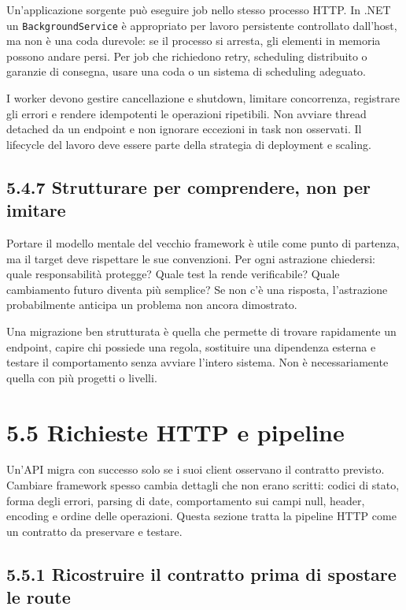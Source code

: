 \documentclass[
  italian,
  10pt,
]{book}
\begin{document}
Un'applicazione sorgente può eseguire job nello stesso processo HTTP. In
.NET un \texttt{BackgroundService} è appropriato per lavoro persistente
controllato dall'host, ma non è una coda durevole: se il processo si
arresta, gli elementi in memoria possono andare persi. Per job che
richiedono retry, scheduling distribuito o garanzie di consegna, usare
una coda o un sistema di scheduling adeguato.

I worker devono gestire cancellazione e shutdown, limitare concorrenza,
registrare gli errori e rendere idempotenti le operazioni ripetibili.
Non avviare thread detached da un endpoint e non ignorare eccezioni in
task non osservati. Il lifecycle del lavoro deve essere parte della
strategia di deployment e scaling.

\subsection{5.4.7 Strutturare per comprendere, non per
imitare}\label{strutturare-per-comprendere-non-per-imitare}

Portare il modello mentale del vecchio framework è utile come punto di
partenza, ma il target deve rispettare le sue convenzioni. Per ogni
astrazione chiedersi: quale responsabilità protegge? Quale test la rende
verificabile? Quale cambiamento futuro diventa più semplice? Se non c'è
una risposta, l'astrazione probabilmente anticipa un problema non ancora
dimostrato.

Una migrazione ben strutturata è quella che permette di trovare
rapidamente un endpoint, capire chi possiede una regola, sostituire una
dipendenza esterna e testare il comportamento senza avviare l'intero
sistema. Non è necessariamente quella con più progetti o livelli.

\section{5.5 Richieste HTTP e pipeline}\label{richieste-http-e-pipeline}

Un'API migra con successo solo se i suoi client osservano il contratto
previsto. Cambiare framework spesso cambia dettagli che non erano
scritti: codici di stato, forma degli errori, parsing di date,
comportamento sui campi null, header, encoding e ordine delle
operazioni. Questa sezione tratta la pipeline HTTP come un contratto da
preservare e testare.

\subsection{5.5.1 Ricostruire il contratto prima di spostare le
route}\label{ricostruire-il-contratto-prima-di-spostare-le-route}
\end{document}
